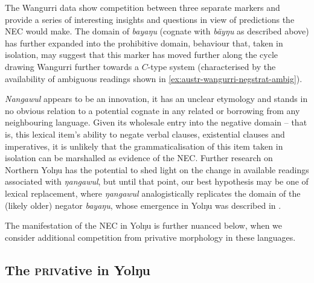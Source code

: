 \documentclass[output=paper]{langsci/langscibook}
\begin{document}
%
The Wangurri data show competition between three separate markers and provide a series of interesting insights and questions in view of predictions the NEC would make. The domain of \textit{bayaŋu} (cognate with \textit{bäyŋu} as described above) has further expanded into the prohibitive domain, behaviour that, taken in isolation, may suggest that this marker has moved further along the cycle drawing Wangurri further towards a $C$-type system (characterised by the availability of ambiguous readings shown in \ref{ex:austr-wangurri-negstrat-ambig}).

\textit{Nangawul} appears to be an innovation, it has an unclear etymology
    and stands in no obvious relation to a potential cognate in any related
    or borrowing from any neighbouring language. Given its wholesale entry
    into the negative domain -- that is, this lexical item's ability to
    negate verbal clauses, existential clauses and imperatives, it is
    unlikely that the grammaticalisation of this item taken in isolation
    can be marshalled as evidence of the NEC. Further research on Northern
    Yolŋu has the potential to shed light on the change in available
    readings associated with \textit{ŋangawul}, but until that point, our
    best hypothesis may be one of lexical replacement, where
    \textit{ŋangawul} analogistically replicates the domain of the (likely
    older) negator \textit{bayaŋu}, whose emergence in Yolŋu was described
    in .

The manifestation of the NEC in Yolŋu is further nuanced below, when we consider additional competition from privative morphology in these languages.

\subsection{The \textsc{priv}ative in Yolŋu}\label{sec:austr-4.4}
\end{document}
